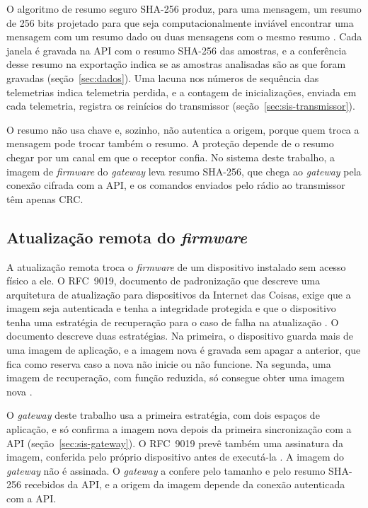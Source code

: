 O algoritmo de resumo seguro SHA-256 produz, para uma mensagem, um resumo de \num{256} bits projetado para que seja computacionalmente inviável encontrar uma mensagem com um resumo dado ou duas mensagens com o mesmo resumo \cite{nist2015}. Cada janela é gravada na API com o resumo SHA-256 das amostras, e a conferência desse resumo na exportação indica se as amostras analisadas são as que foram gravadas (seção~\ref{sec:dados}). Uma lacuna nos números de sequência das telemetrias indica telemetria perdida, e a contagem de inicializações, enviada em cada telemetria, registra os reinícios do transmissor (seção~\ref{sec:sis-transmissor}).

O resumo não usa chave e, sozinho, não autentica a origem, porque quem troca a mensagem pode trocar também o resumo. A proteção depende de o resumo chegar por um canal em que o receptor confia. No sistema deste trabalho, a imagem de \textit{firmware} do \textit{gateway} leva resumo SHA-256, que chega ao \textit{gateway} pela conexão cifrada com a API, e os comandos enviados pelo rádio ao transmissor têm apenas CRC.

\subsection{Atualização remota do \textit{firmware}}\label{sec:fund-atualizacao}

A atualização remota troca o \textit{firmware} de um dispositivo instalado sem acesso físico a ele. O RFC~9019, documento de padronização que descreve uma arquitetura de atualização para dispositivos da Internet das Coisas, exige que a imagem seja autenticada e tenha a integridade protegida e que o dispositivo tenha uma estratégia de recuperação para o caso de falha na atualização \cite{moran2021}. O documento descreve duas estratégias. Na primeira, o dispositivo guarda mais de uma imagem de aplicação, e a imagem nova é gravada sem apagar a anterior, que fica como reserva caso a nova não inicie ou não funcione. Na segunda, uma imagem de recuperação, com função reduzida, só consegue obter uma imagem nova \cite{moran2021}.

O \textit{gateway} deste trabalho usa a primeira estratégia, com dois espaços de aplicação, e só confirma a imagem nova depois da primeira sincronização com a API (seção~\ref{sec:sis-gateway}). O RFC~9019 prevê também uma assinatura da imagem, conferida pelo próprio dispositivo antes de executá-la \cite{moran2021}. A imagem do \textit{gateway} não é assinada. O \textit{gateway} a confere pelo tamanho e pelo resumo SHA-256 recebidos da API, e a origem da imagem depende da conexão autenticada com a API.

